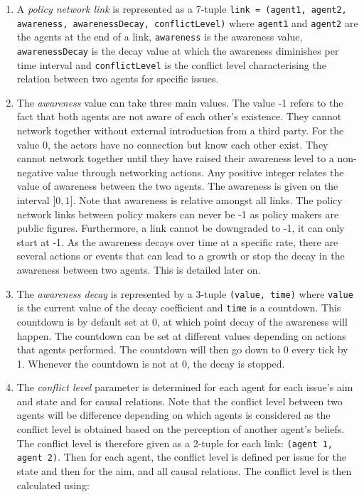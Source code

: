 \begin{enumerate}
\item A \emph{policy network link} is represented as a 7-tuple \texttt{link = (agent1, agent2, awareness, awarenessDecay, conflictLevel)} where \texttt{agent1} and \texttt{agent2} are the agents at the end of a link, \texttt{awareness} is the awareness value, \texttt{awarenessDecay} is the decay value at which the awareness diminishes per time interval and \texttt{conflictLevel} is the conflict level characterising the relation between two agents for specific issues.

\item The \emph{awareness} value can take three main values. The value -1 refers to the fact that both agents are not aware of each other’s existence. They cannot network together without external introduction from a third party. For the value 0, the actors have no connection but know each other exist. They cannot network together until they have raised their awareness level to a non-negative value through networking actions. Any positive integer relates the value of awareness between the two agents. The awareness is given on the interval $]0,1]$. Note that awareness is relative amongst all links. The policy network links between policy makers can never be -1 as policy makers are public figures. Furthermore, a link cannot be downgraded to -1, it can only start at -1. As the awareness decays over time at a specific rate, there are several actions or events that can lead to a growth or stop the decay in the awareness between two agents. This is detailed later on.

\item The \emph{awareness decay} is represented by a 3-tuple \texttt{(value, time)} where \texttt{value} is the current value of the decay coefficient and \texttt{time} is a countdown. This countdown is by default set at 0, at which point decay of the awareness will happen. The countdown can be set at different values depending on actions that agents performed. The countdown will then go down to 0 every tick by 1. Whenever the countdown is not at 0, the decay is stopped.

\item The \emph{conflict level} parameter is determined for each agent for each issue's aim and state and for causal relations. Note that the conflict level between two agents will be difference depending on which agents is considered as the conflict level is obtained based on the perception of another agent's beliefs. The conflict level is therefore given as a 2-tuple for each link: \texttt{(agent 1, agent 2)}. Then for each agent, the conflict level is defined per issue for the state and then for the aim, and all causal relations. The conflict level is then calculated using:


\end{enumerate}
